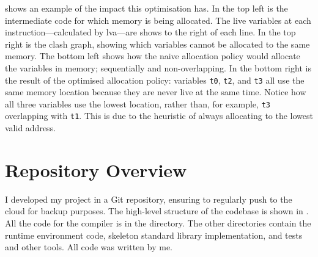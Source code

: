 \documentclass[00-main.tex]{subfiles}
\begin{document}
 shows an example of the impact this optimisation has.
In the top left is the intermediate code for which memory is being allocated.
The live variables at each instruction---calculated by \gls{lva}---are shows to the right of each line.
In the top right is the clash graph, showing which variables cannot be allocated to the same memory.
The bottom left shows how the naive allocation policy would allocate the variables in memory; sequentially and non-overlapping.
In the bottom right is the result of the optimised allocation policy: variables \texttt{t0}, \texttt{t2}, and \texttt{t3} all use the same memory location because they are never live at the same time.
Notice how all three variables use the lowest location, rather than, for example, \texttt{t3} overlapping with \texttt{t1}.
This is due to the heuristic of always allocating to the lowest valid address.


\section{Repository Overview}

I developed my project in a Git repository, ensuring to regularly push to the cloud for backup purposes.
The high-level structure of the codebase is shown in .
All the code for the compiler is in the  directory.
The other directories contain the runtime environment code, skeleton standard library implementation, and tests and other tools.
All code was written by me.

\newlength\IndentWidth\setlength\IndentWidth{1em}
\end{document}

